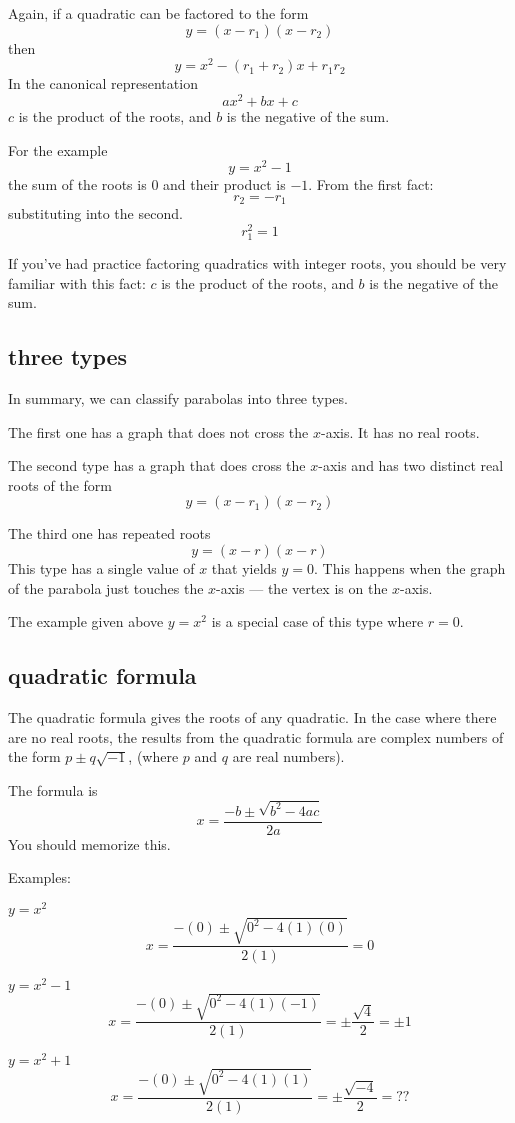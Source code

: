 \documentclass[11pt, oneside]{article}
\begin{document}
Again, if a quadratic can be factored to the form
\[ y = (x - r_1)(x - r_2) \]
then
\[ y = x^2 - (r_1 + r_2) x + r_1 r_2 \]
In the canonical representation
\[ ax^2 + bx + c \]
$c$ is the product of the roots, and $b$ is the negative of the sum.

For the example 
\[ y = x^2 - 1 \]
the sum of the roots is $0$ and their product is $-1$.  From the first fact:
\[ r_2 = - r_1 \]
substituting into the second.
\[ r_1^2 = 1 \]

If you've had practice factoring quadratics with integer roots, you should be very familiar with this fact:  $c$ is the product of the roots, and $b$ is the negative of the sum.

\subsection*{three types}
In summary, we can classify parabolas into three types.  

The first one has a graph that does not cross the $x$-axis.  It has no real roots.

The second type has a graph that does cross the $x$-axis and has two distinct real roots of the form
\[ y = (x - r_1)(x - r_2) \]

The third one has repeated roots
\[ y = (x - r)(x - r) \]
This type has a single value of $x$ that yields $y = 0$.  This happens when the graph of the parabola just touches the $x$-axis --- the vertex is on the $x$-axis.

The example given above $y = x^2$ is a special case of this type where $r = 0$.

\subsection*{quadratic formula}
The quadratic formula gives the roots of any quadratic.  In the case where there are no real roots, the results from the quadratic formula are complex numbers of the form $p \pm q \sqrt{-1}$, (where $p$ and $q$ are real numbers).

The formula is
\[ x = \frac{-b \pm \sqrt{b^2 - 4ac}}{2a} \]
You should memorize this.

Examples:

$y = x^2$
\[ x = \frac{-(0) \pm \sqrt{0^2 - 4(1)(0)}}{2(1)} = 0 \]

$y = x^2 - 1$
\[ x = \frac{-(0) \pm \sqrt{0^2 - 4(1)(-1)}}{2(1)} = \pm \frac{\sqrt{4}}{2} = \pm 1 \]

$y = x^2 + 1$
\[ x = \frac{-(0) \pm \sqrt{0^2 - 4(1)(1)}}{2(1)} =  \pm \frac{\sqrt{-4}}{2} = ?? \]
\end{document}
